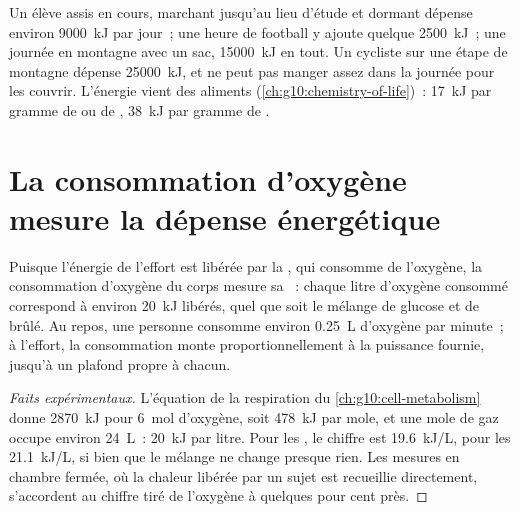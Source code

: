 \begin{example}\label{ex:g10:exercise-and-energy:budgets}
Un élève assis en cours, marchant jusqu'au lieu d'étude et dormant
dépense environ \qty{9000}{kJ} par jour~; une heure de football y
ajoute quelque \qty{2500}{kJ}~; une journée en montagne avec un sac,
\qty{15000}{kJ} en tout. Un cycliste sur une étape de montagne dépense
\qty{25000}{kJ}, et ne peut pas manger assez dans la journée pour les
couvrir. L'énergie vient des aliments
(\cref{ch:g10:chemistry-of-life})~: \qty{17}{kJ} par gramme de 
ou de , \qty{38}{kJ} par gramme de .
\end{example}

\section{La consommation d'oxygène mesure la dépense énergétique}

\begin{proposition}\label{prop:g10:exercise-and-energy:oxygen}
Puisque l'énergie de l'effort est libérée par la , qui consomme de l'oxygène, la consommation d'oxygène du
corps mesure sa ~: chaque litre d'oxygène consommé
correspond à environ \qty{20}{kJ} libérés, quel que soit le mélange de
glucose et de  brûlé. Au repos, une personne consomme environ
\qty{0.25}{L} d'oxygène par minute~; à l'effort, la consommation monte
proportionnellement à la puissance fournie, jusqu'à un plafond propre à
chacun.
\end{proposition}
\begin{proof}[Faits expérimentaux]
L'équation de la respiration du \cref{ch:g10:cell-metabolism} donne
\qty{2870}{kJ} pour \qty{6}{mol} d'oxygène, soit \qty{478}{kJ} par
mole, et une mole de gaz occupe environ \qty{24}{L}~: \qty{20}{kJ} par
litre. Pour les , le chiffre est \qty{19.6}{kJ/L}, pour les
 \qty{21.1}{kJ/L}, si bien que le mélange ne change presque
rien. Les mesures en chambre fermée, où la chaleur libérée par un sujet
est recueillie directement, s'accordent au chiffre tiré de l'oxygène à
quelques pour cent près.
\end{proof}

